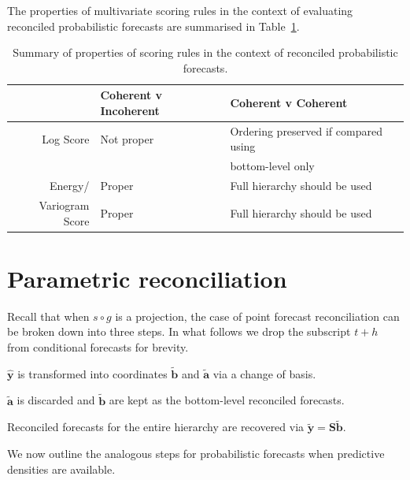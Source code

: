 \documentclass[12pt]{article}
\theoremstyle{definition}
\begin{document}
The properties of multivariate scoring rules in the context of evaluating reconciled probabilistic forecasts are summarised in Table~\ref{tab:prop}.

\begin{table}
	\caption{Summary of properties of scoring rules in the context of reconciled probabilistic forecasts.}
	\centering
	\begin{tabular}{rll}
		& Coherent v Incoherent &Coherent v Coherent\\
		\hline
		Log Score & Not proper & Ordering preserved if compared using\\ &&bottom-level only\\
		Energy/ & Proper & Full hierarchy should be used\\
		Variogram Score & Proper & Full hierarchy should be used\\
		\hline
	\end{tabular}
	
	\label{tab:prop}
\end{table}


\section{Parametric reconciliation} \label{sec:ParamRecon}

Recall that when $s\circ g$ is a projection, the case of point forecast reconciliation can be broken down into three steps. In what follows we drop the subscript $t+h$ from conditional forecasts for brevity.
\begin{compactenum}
	\item $\hat{\bm{y}}$ is transformed into coordinates $\tilde{\bm{b}}$ and $\tilde{\bm{a}}$ via a change of basis.
	\item $\tilde{\bm{a}}$ is discarded and $\tilde{\bm{b}}$ are kept as the bottom-level reconciled forecasts.
	\item Reconciled forecasts for the entire hierarchy are recovered via $\tilde{\bm{y}}=\bm{S}\tilde{\bm{b}}$.
\end{compactenum}

We now outline the analogous steps for probabilistic forecasts when predictive densities are available.
\end{document}
